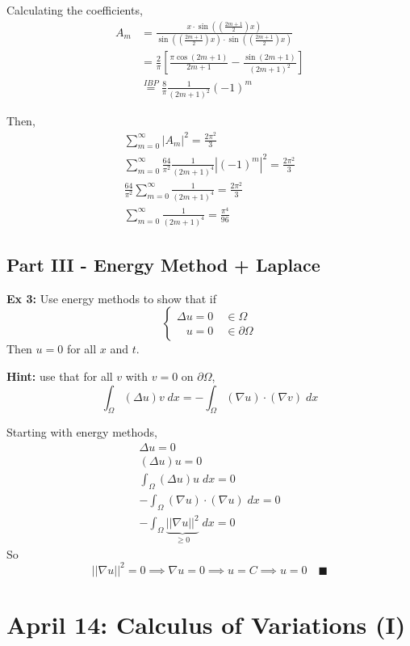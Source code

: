 \documentclass[12pt]{article}
\begin{document}
Calculating the coefficients, 
\begin{align*}
    A_m &= \frac{x \cdot \sin\left(\left(\frac{2m + 1}{2}\right)x\right)}{\sin\left(\left(\frac{2m + 1}{2}\right)x\right) \cdot \sin\left(\left(\frac{2m + 1}{2}\right)x\right)}\\
    &= \frac{2}{\pi}\left[\frac{\pi\cos(2m + 1)}{2m + 1} - \frac{\sin(2m + 1)}{(2m + 1)^2}\right]\\
    &\overset{IBP}{=} \frac{8}{\pi} \frac{1}{(2m + 1)^2}(-1)^m
\end{align*}

Then, 
\begin{gather*}
    \sum_{m=0}^\infty |A_m|^2 = \frac{2\pi^2}{3}\\
    \sum_{m=0}^\infty \frac{64}{\pi^2} \frac{1}{(2m+1)^4} |(-1)^m|^2 = \frac{2\pi^2}{3}\\
    \frac{64}{\pi^2} \sum_{m=0}^\infty \frac{1}{(2m+1)^4} = \frac{2\pi^2}{3}\\
    \boxed{\sum_{m=0}^\infty \frac{1}{(2m+1)^4} = \frac{\pi^4}{96}}
\end{gather*}

\subsection*{Part III - Energy Method + Laplace}
\textbf{Ex 3:} Use energy methods to show that if 
\[\begin{cases*}
    \Delta u = 0 \quad \in \Omega\\
    \; \; \; u = 0 \quad \in \partial \Omega
\end{cases*}\]
Then $u = 0$ for all $x$ and $t$. 

\textbf{Hint:} use that for all $v$ with $v = 0$ on $\partial \Omega$, 
\[\int_\Omega  (\Delta u)v\; dx = -\int_{\Omega} (\nabla u) \cdot (\nabla v)\; dx\]

Starting with energy methods, 
\begin{gather*}
    \Delta u = 0\\
    (\Delta u)u = 0\\
    \int_\Omega (\Delta u) u\; dx = 0\\
    -\int_\Omega (\nabla u) \cdot (\nabla u)\; dx = 0\\
    -\int_\Omega \underbrace{||\nabla u||^2}_{\geq 0}\; dx = 0
\end{gather*}
So 
\[||\nabla u||^2 = 0 \implies \nabla u = 0 \implies u = C \implies u = 0 \quad \blacksquare\]

\section{April 14: Calculus of Variations (I)}
\end{document}
